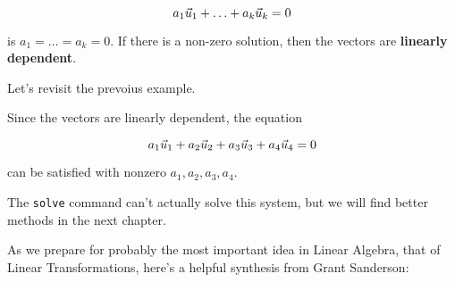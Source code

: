 \documentclass{ximera}
\begin{document}
\begin{exploration}
\begin{remark}
\begin{definition}
  $$a_1\vec{u}_1+\ldots+a_k\vec{u}_k=0$$

  is $a_1=\ldots=a_k=0$. If there is a non-zero solution, then the vectors are \textbf{linearly dependent}.
\end{definition}

\begin{example}

  Let's revisit the prevoius example.

  Since the vectors are linearly dependent, the equation

  $$a_1\vec{u}_1+a_2\vec{u}_2+a_3\vec{u}_3+a_4\vec{u}_4=0$$

  can be satisfied with nonzero $a_1,a_2,a_3,a_4$.

  The \texttt{solve} command can't actually solve this system, but we will find better methods in the next chapter.
\end{example}

\end{remark}

\end{exploration}

As we prepare for probably the most important idea in Linear Algebra, that of Linear Transformations, here's a helpful synthesis from Grant Sanderson:

\end{document}

